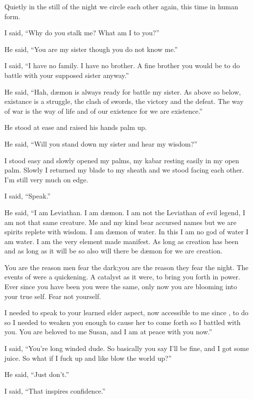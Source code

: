 \lettrine[lines=2,lraise=0]{Q}\space uietly in the still of the night we circle each other again, this time in human form.

I said, ``Why do you stalk me? What am I to you?''

He said, ``You are my sister though you do not know me.''

I said, ``I have no family. I have no brother. A fine brother you would be to do battle with your supposed sister anyway.''

He said, ``Hah, d\ae mon is always ready for battle my sister. As above so below, existance is a struggle, the clash of swords, the victory and the defeat. The way of war is the way of life and of our existence for we are existence.''

He stood at ease and raised his hands palm up.

He said, ``Will you stand down my sister and hear my wisdom?''

I stood easy and slowly opened my palms, my kabar resting easily in my open palm. Slowly I returned my blade to my sheath and we stood facing each other. I'm still very much on edge.

I said, ``Speak.''

He said, ``I am Leviathan. I am d\ae mon. I am not the Leviathan of evil legend, I am not that same creature. Me and my kind bear accursed names but we are spirits replete with wisdom. I am d\ae mon of water. In this I am no god of water I am water. I am the very element made manifest. As long as creation has been and as long as it will be so also will there be d\ae mon for we are creation. 

You are the reason men fear the dark;you are the reason they fear the night. The events of \chichenitza* were a quickening. A catalyst as it were, to bring you forth in power. Ever since you have been you were the same, only now you are blooming into your true self. Fear not yourself.

I needed to speak to your learned elder aspect, now accessible to me since \chichenitza*, to do so I needed to weaken you enough to cause her to come forth so I battled with you. You are beloved to me Susan, and I am at peace with you now.''

I said, ``You're long winded dude. So basically you say I'll be fine, and I got some juice. So what if I fuck up and like blow the world up?''

He said, ``Just don't.''

I said, ``That inspires confidence.''


